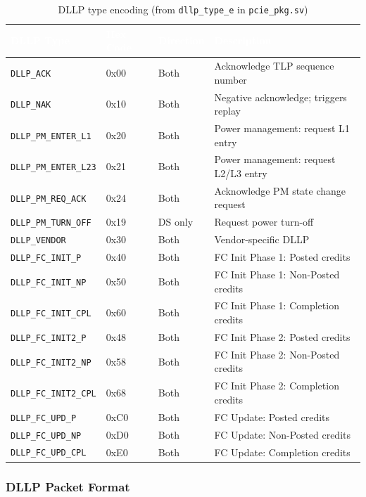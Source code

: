 \documentclass[11pt,a4paper]{article}
\newcommand{\theadcell}[1]{%
  \cellcolor{tablehead}\textcolor{white}{\textbf{#1}}}
\begin{document}
\begin{table}[h!]
\centering
\label{tab:dllptypes}
\begin{tabular}{lllp{6cm}}
  \toprule
  \theadcell{DLLP Type} & \theadcell{Hex Code} & \theadcell{Direction} & \theadcell{Description} \\
  \midrule
  \texttt{DLLP\_ACK}          & 0x00 & Both & Acknowledge TLP sequence number \\
  \texttt{DLLP\_NAK}          & 0x10 & Both & Negative acknowledge; triggers replay \\
  \texttt{DLLP\_PM\_ENTER\_L1}& 0x20 & Both & Power management: request L1 entry \\
  \texttt{DLLP\_PM\_ENTER\_L23}& 0x21 & Both & Power management: request L2/L3 entry \\
  \texttt{DLLP\_PM\_REQ\_ACK} & 0x24 & Both & Acknowledge PM state change request \\
  \texttt{DLLP\_PM\_TURN\_OFF}& 0x19 & DS only & Request power turn-off \\
  \texttt{DLLP\_VENDOR}       & 0x30 & Both & Vendor-specific DLLP \\
  \texttt{DLLP\_FC\_INIT\_P}  & 0x40 & Both & FC Init Phase 1: Posted credits \\
  \texttt{DLLP\_FC\_INIT\_NP} & 0x50 & Both & FC Init Phase 1: Non-Posted credits \\
  \texttt{DLLP\_FC\_INIT\_CPL}& 0x60 & Both & FC Init Phase 1: Completion credits \\
  \texttt{DLLP\_FC\_INIT2\_P} & 0x48 & Both & FC Init Phase 2: Posted credits \\
  \texttt{DLLP\_FC\_INIT2\_NP}& 0x58 & Both & FC Init Phase 2: Non-Posted credits \\
  \texttt{DLLP\_FC\_INIT2\_CPL}& 0x68 & Both & FC Init Phase 2: Completion credits \\
  \texttt{DLLP\_FC\_UPD\_P}   & 0xC0 & Both & FC Update: Posted credits \\
  \texttt{DLLP\_FC\_UPD\_NP}  & 0xD0 & Both & FC Update: Non-Posted credits \\
  \texttt{DLLP\_FC\_UPD\_CPL} & 0xE0 & Both & FC Update: Completion credits \\
  \bottomrule
\end{tabular}
\caption{DLLP type encoding (from \texttt{dllp\_type\_e} in \texttt{pcie\_pkg.sv})}
\end{table}

\subsubsection{DLLP Packet Format}
\end{document}
